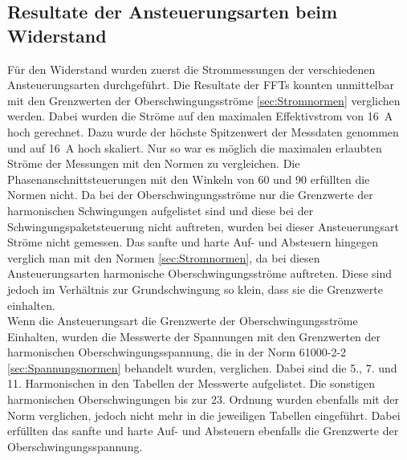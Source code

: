 \subsection{Resultate der Ansteuerungsarten beim Widerstand}
Für den Widerstand wurden zuerst die Strommessungen der verschiedenen Ansteuerungsarten durchgeführt. Die Resultate der FFTs konnten unmittelbar mit den Grenzwerten der Oberschwingungsströme \ref{sec:Stromnormen} verglichen werden. Dabei wurden die Ströme auf den maximalen Effektivstrom von \SI{16}{A} hoch gerechnet. Dazu wurde der höchste Spitzenwert der Messdaten genommen und auf \SI{16}{A} hoch skaliert. Nur so war es möglich die maximalen erlaubten Ströme der Messungen mit den Normen zu vergleichen. Die Phasenanschnittsteuerungen mit den Winkeln von 60\textdegree \hspace{0.02cm} und 90\textdegree \hspace{0.02cm} erfüllten die Normen nicht. Da bei der Oberschwingungsströme nur die Grenzwerte der harmonischen Schwingungen aufgelistet sind und diese bei der Schwingungspaketsteuerung nicht auftreten, wurden bei dieser Ansteuerungsart Ströme nicht gemessen. Das sanfte und harte Auf- und Absteuern hingegen verglich man mit den Normen \ref{sec:Stromnormen}, da bei diesen Ansteuerungsarten harmonische Oberschwingungsströme auftreten. Diese sind jedoch im Verhältnis zur Grundschwingung so klein, dass sie die Grenzwerte einhalten.\\ 

Wenn die Ansteuerungsart die Grenzwerte der Oberschwingungsströme Einhalten, wurden die Messwerte der Spannungen mit den Grenzwerten der harmonischen Oberschwingungsspannung, die in der Norm 61000-2-2 \ref{sec:Spannungsnormen} behandelt wurden, verglichen. Dabei sind die 5., 7. und 11. Harmonischen in den Tabellen der Messwerte aufgelistet. Die sonstigen harmonischen Oberschwingungen bis zur 23. Ordnung wurden ebenfalls mit der Norm verglichen, jedoch nicht mehr in die jeweiligen Tabellen eingeführt. Dabei erfüllten das sanfte und harte Auf- und Absteuern ebenfalls die Grenzwerte der Oberschwingungsspannung.\\

